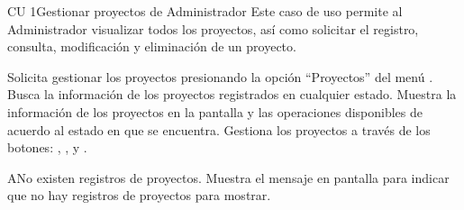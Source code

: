 \begin{UseCase}{CU 1}{Gestionar proyectos de Administrador}
	{
		Este caso de uso permite al Administrador visualizar todos los proyectos, así como solicitar el registro, consulta, modificación y eliminación de un proyecto.
	}
	
	

	


\end{UseCase}
 \begin{UCtrayectoria}
    \UCpaso[\UCactor] Solicita gestionar los proyectos presionando la opción ``Proyectos'' del menú .
    \UCpaso[\UCsist] Busca la información de los proyectos registrados en cualquier estado. 
    \UCpaso[\UCsist] Muestra la información de los proyectos en la pantalla  y las operaciones 
    disponibles de acuerdo al estado en que se encuentra.
    \UCpaso[\UCactor] Gestiona los proyectos a través de los botones: , \btnConsulta, \btnEditar y \btnEliminar. \label{cu1:gestiona}
 \end{UCtrayectoria}
 
 \begin{UCtrayectoriaA}{A}{No existen registros de proyectos.}
    \UCpaso[\UCsist] Muestra el mensaje  en pantalla  
    para indicar que no hay registros de proyectos para mostrar.
 \end{UCtrayectoriaA}
 

